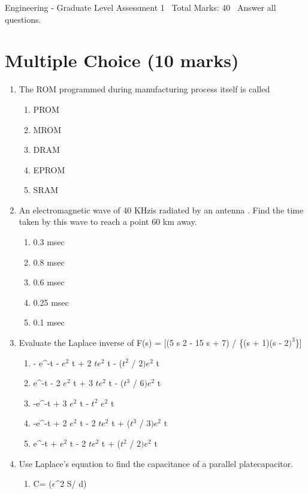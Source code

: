 \documentclass[12pt]{article}
\begin{document}
\begin{center}
Engineering - Graduate Level Assessment 1 \
Total Marks: 40 \
Answer all questions.
\end{center}

\section*{Multiple Choice (10 marks)}
\begin{enumerate}[label=\arabic*.]
\item The ROM programmed during manufacturing process itself is called
\begin{enumerate}[label=(\alph*)]
    \item PROM
    \item MROM
    \item DRAM
    \item EPROM
    \item SRAM
\end{enumerate}
\item An electromagnetic wave of 40 KHzis radiated by an antenna . Find the time taken by this wave to reach a point 60 km away.
\begin{enumerate}[label=(\alph*)]
    \item 0.3 msec
    \item 0.8 msec
    \item 0.6 msec
    \item 0.25 msec
    \item 0.1 msec
\end{enumerate}
\item Evaluate the Laplace inverse of F(s) = [(5 s 2 - 15 s + 7) / \{(s + 1)(s - $2)^3$\}]
\begin{enumerate}[label=(\alph*)]
    \item - e^-t - $e^2$ t + 2 $te^2$ t - ($t^2$ / $2)e^2$ t
    \item e^-t - 2 $e^2$ t + 3 $te^2$ t - ($t^3$ / $6)e^2$ t
    \item -e^-t + 3 $e^2$ t - $t^2$ $e^2$ t
    \item -e^-t + 2 $e^2$ t - 2 $te^2$ t + ($t^3$ / $3)e^2$ t
    \item e^-t + $e^2$ t - 2 $te^2$ t + ($t^2$ / $2)e^2$ t
\end{enumerate}
\item Use Laplace's equation to find the capacitance of a parallel platecapacitor.
\begin{enumerate}[label=(\alph*)]
    \item C= (\ensuremath{\epsilon}^2 S/ d)

\end{enumerate}
\end{enumerate}
\end{document}
